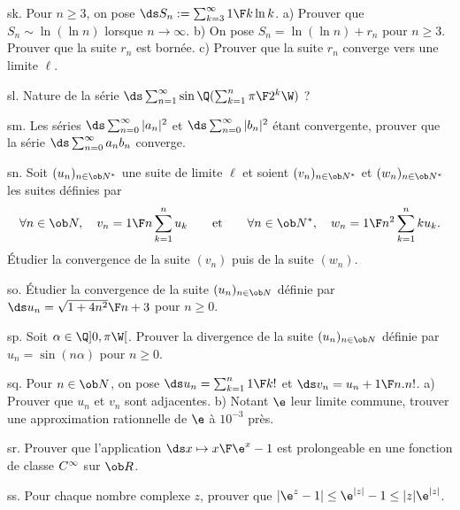 \exo [Level=2,Fight=0,Learn=0,Type=\Exercices,Field=\Suites,Origin=] sk. 
Pour $n\ge3$, on pose $\ds S_n:=\sum_{k=3}^\infty{1\F k\ln k}$. \pn
a) Prouver que $S_n\sim\ln(\ln n)$ lorsque $n\to\infty$. \pn
b) On pose $S_n=\ln(\ln n)+r_n$ pour $n\ge3$. Prouver que la suite $r_n$ est bornée. \pn
c) Prouver que la suite $r_n$ converge vers une limite $\ell$. 

\exo [Level=2,Fight=0,Learn=0,Type=\Exercices,Field=\SériesNumériques,Origin=] sl. 
Nature de la série $\ds\sum_{n=1}^\infty\sin\Q(\sum_{k=1}^n{\pi\F 2^k}\W)$ ? 

\exo [Level=2,Fight=0,Learn=0,Type=\Exercices,Field=\SériesNumériques,Origin=] sm. 
Les séries $\ds\sum_{n=0}^\infty|a_n|^2$ et $\ds\sum_{n=0}^\infty|b_n|^2$ étant convergente, 
prouver que la série $\ds\sum_{n=0}^\infty a_nb_n$ converge. 

\exo [Level=2,Fight=0,Learn=0,Type=\Exercices,Field=\SériesNumériques,Origin=] sn. 
Soit $(u_n)_{n\in\ob N^*}$ une suite de limite $\ell$ et soient $(v_n)_{n\in\ob N^*}$ 
et $(w_n)_{n\in\ob N^*}$  
les suites définies par 
$$
\forall n\in\ob N, \quad v_n={1\F n}\sum_{k=1}^n u_k\qquad\hbox{et}\qquad\forall n\in\ob N^*, \quad w_n={1\F n^2}\sum_{k=1}^nku_k.
$$
Étudier la convergence de la suite $(v_n)$ puis de la suite $(w_n)$. 

\exo [Level=1,Fight=0,Learn=0,Type=\Exercices,Field=\Suites,Origin=] so. 
Étudier la convergence de la suite $(u_n)_{n\in\ob N}$ définie par 
$\ds u_n={\sqrt{1+4n^2}\F n+3}$ pour $n\ge0$. 

\exo [Level=1,Fight=0,Learn=0,Type=\Exercices,Field=\Suites,Origin=] sp. 
Soit $\alpha\in\Q]0,\pi\W[$. Prouver la divergence de la suite $(u_n)_{n\in\ob N}$ 
définie par $u_n=\sin(n\alpha)$ pour $n\ge0$. 

\exo [Level=1,Fight=0,Learn=0,Type=\Exercices,Field=\Suites,Origin=] sq. 
Pour $n\in\ob N$, on pose $\ds u_n=\sum_{k=1}^n{1\F k!}$ et $\ds v_n=u_n+{1\F n.n!}$. \pn
a) Prouver que $u_n$ et $v_n$ sont adjacentes. \pn 
b) Notant $\e$ leur limite commune, trouver une approximation rationnelle de $\e$ à $10^{-3}$ près. 

\exo [Level=2,Fight=0,Learn=0,Type=\Exercices,Field=\SériesEntières,Origin=] sr. 
Prouver que l'application $\ds x\mapsto {x\F \e^x-1}$ est prolongeable en une fonction de classe $\sc C^\infty$ sur $\ob R$. 

\exo [Level=2,Fight=0,Learn=0,Type=\Exercices,Field=\NombresComplexes,Origin=] ss. 
Pour chaque nombre complexe $z$, prouver que $|\e^z-1|\le \e^{|z|}-1\le |z|\e^{|z|}$. 

